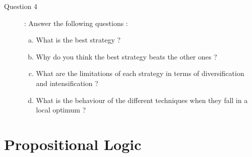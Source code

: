 \begin{description}


\item[Question 4]: Answer the following questions :
\begin{enumerate}[(a)]
\item What is the best strategy ?\\

\item Why do you think the best strategy beats the other ones ?\\

\item What are the limitations of each strategy in terms of diversification and intensification ?\\

\item What is the behaviour of the different techniques when they fall in a local optimum ?\\

\end{enumerate}
\end{description}

\section{Propositional Logic}
